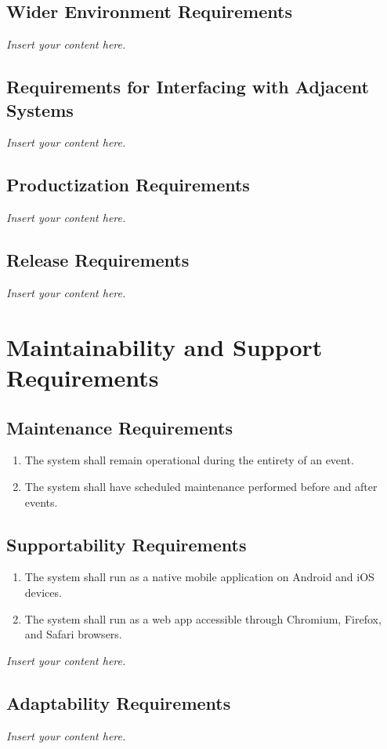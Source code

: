 \documentclass[12pt]{article}
\newcommand{\lips}{\textit{Insert your content here.}}
\begin{document}
\subsection{Wider Environment Requirements}
\lips
\subsection{Requirements for Interfacing with Adjacent Systems}
\lips
\subsection{Productization Requirements}
\lips
\subsection{Release Requirements}
\lips

\section{Maintainability and Support Requirements}
\subsection{Maintenance Requirements}
\begin{enumerate}[align=left,
  leftmargin=*,
  labelsep=1em,
  itemindent=0em,
  label=\bfseries MT-\arabic*:]
  \item The system shall remain operational during the entirety of an event.
  \item The system shall have scheduled maintenance performed before and after events.
\end{enumerate}
\subsection{Supportability Requirements}
\begin{enumerate}[align=left,
  leftmargin=*,
  labelsep=1em,
  itemindent=0em,
  label=\bfseries SU-\arabic*:]
  \item The system shall run as a native mobile application on Android and iOS devices.
  \item The system shall run as a web app accessible through Chromium, Firefox, and
    Safari browsers.
\end{enumerate}
\lips
\subsection{Adaptability Requirements}
\lips
\end{document}
